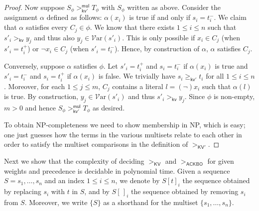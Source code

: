 \documentclass{tlp}
\newcommand{\m}[1]{\mathsf{#1}}
\newcommand{\mc}[1]{\mathcal{#1}}
\newcommand{\mr}[1]{\mathrm{#1}}
\newcommand{\Wt}{\m{w,root}}
\renewcommand{\Wt}{\m{kv}}
\newcommand{\kvc}{{\m{kv'}}}
\newcommand{\mul}{\m{mul}}
\newcommand{\VV}{\mc{V}}
\newcommand{\Var}{\VV\mr{ar}}
\newcommand{\ackbo}{\mr{\m{ACKBO}}}
\newcommand{\KV}{\mr{\m{KV}}}
\newcommand{\KVC}{\mr{\m{KV'}}}
\newcommand{\seq}[2][n]{{#2_1},\dots,{#2_{#1}}}
\begin{document}
\begin{proof}
Now suppose $S_\phi >_\kvc^\mul T_\phi$
with $S_\phi$ written as above.
Consider the assignment $\alpha$ defined as follows:
$\alpha(x_i)$ is true if and only if $s_i = t_i^-$. We claim
that $\alpha$ satisfies every $C_j \in \phi$.
We know that there exists $1 \leqslant i \leqslant n$ such that
$s'_i >_\Wt y_j$ and thus also
$y_j \in \Var(s'_i)$. This is only
possible if $x_i \in C_j$ (when $s'_i = t_i^+$)
or $\neg x_i \in C_j$ (when $s'_i = t_i^-$). Hence, by construction
of $\alpha$, $\alpha$ satisfies $C_j$.

Conversely, suppose $\alpha$ satisfies $\phi$. Let $s'_i = t_i^+$ and
$s_i = t_i^-$ if $\alpha(x_i)$ is true and $s'_i = t_i^-$ and
$s_i = t_i^+$ if $\alpha(x_i)$ is false. We trivially have
$s_i \geqslant_\kvc t_i$ for all
$1 \leqslant i \leqslant n$.
Moreover, for each $1 \leqslant j \leqslant m$, $C_j$ contains a literal
$l = (\neg) x_i$ such that $\alpha(l)$ is true.
By construction, $y_j \in \Var(s'_i)$ and thus $s'_i >_\Wt y_j$.
Since $\phi$ is non-empty, $m > 0$ and hence $S_\phi >_\kvc^\mul T_\phi$
as desired.

To obtain NP-completeness we need to show membership in NP, which is
easy; one just guesses how the terms in
the various multisets relate to each other in order to satisfy
the multiset comparisons in the definition of $>_\KVC$.
\end{proof}

Next we show that the complexity of deciding $>_\KV$
and $>_\ackbo$ for given weights and precedence is
decidable in polynomial time.
Given a sequence $S = \seq{s}$ and an index $1 \leqslant i \leqslant n$, we
denote by $S[t]_i$ the sequence
obtained by replacing $s_i$ with $t$ in $S$, and
by $S[\,]_i$ the sequence obtained by removing $s_i$ from $S$.
Moreover, we write $\{ S \}$ as a shorthand for the multiset 
$\{ \seq{s} \}$.
\end{document}
